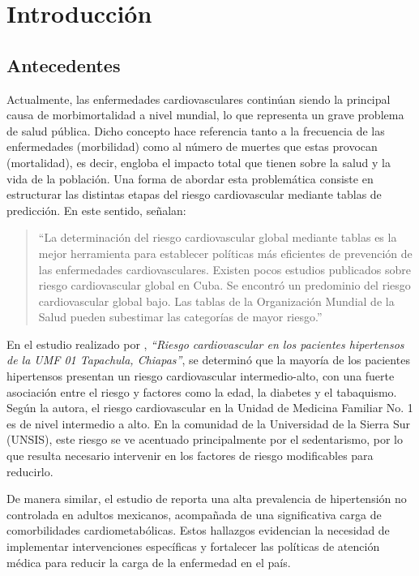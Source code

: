 \chapter{Introducción} 

\section{Antecedentes}
    Actualmente, las enfermedades cardiovasculares continúan siendo la principal causa de morbimortalidad a nivel mundial, lo que representa un grave problema de salud pública. Dicho concepto hace referencia tanto a la frecuencia de las enfermedades (morbilidad) como al número de muertes que estas provocan (mortalidad), es decir, engloba el impacto total que tienen sobre la salud y la vida de la población. Una forma de abordar esta problemática consiste en estructurar las distintas etapas del riesgo cardiovascular mediante tablas de predicción. En este sentido, \textcite{rodriguez2023riesgo} señalan:
    
    \begin{quote}
    “La determinación del riesgo cardiovascular global mediante tablas es la mejor herramienta para establecer políticas más eficientes de prevención de las enfermedades cardiovasculares. Existen pocos estudios publicados sobre riesgo cardiovascular global en Cuba. Se encontró un predominio del riesgo cardiovascular global bajo. Las tablas de la Organización Mundial de la Salud pueden subestimar las categorías de mayor riesgo.” 
    \end{quote}
    En el estudio realizado por \textcite{ancheytariesgo}, \textit{“Riesgo cardiovascular en los pacientes hipertensos de la UMF 01 Tapachula, Chiapas”}, se determinó que la mayoría de los pacientes hipertensos presentan un riesgo cardiovascular intermedio-alto, con una fuerte asociación entre el riesgo y factores como la edad, la diabetes y el tabaquismo. Según la autora, el riesgo cardiovascular en la Unidad de Medicina Familiar No. 1 es de nivel intermedio a alto. En la comunidad de la Universidad de la Sierra Sur (UNSIS), este riesgo se ve acentuado principalmente por el sedentarismo, por lo que resulta necesario intervenir en los factores de riesgo modificables para reducirlo.

    De manera similar, el estudio de \textcite{10.1093/ajh/hpae024} reporta una alta prevalencia de hipertensión no controlada en adultos mexicanos, acompañada de una significativa carga de comorbilidades cardiometabólicas. Estos hallazgos evidencian la necesidad de implementar intervenciones específicas y fortalecer las políticas de atención médica para reducir la carga de la enfermedad en el país.
    
